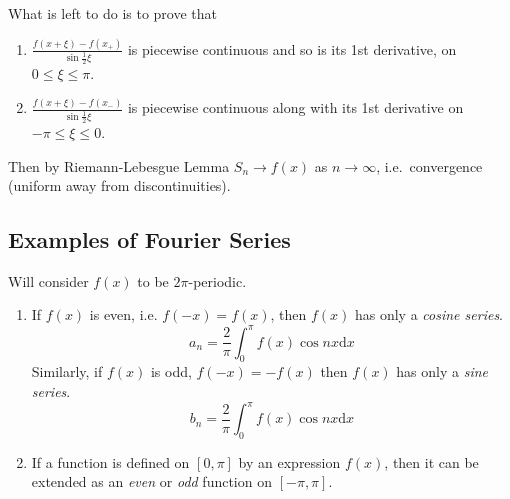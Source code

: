 \documentclass[12pt]{report}
\theoremstyle{definition}
\begin{document}
What is left to do is to prove that 
\begin{enumerate}[label = (\roman*)]
    \item $\frac{f(x + \xi) - f(x_+)}{\sin{\frac{1}{2} \xi}}$ is piecewise continuous and so is its 1st derivative,
        on $0 \le \xi \le \pi$.
    \item $\frac{f(x+\xi) - f(x_-)}{\sin{\frac{1}{2} \xi}}$ is piecewise continuous along with its 1st derivative on
        $-\pi \le \xi \le 0$.
\end{enumerate}
Then by Riemann-Lebesgue Lemma $S_n \rightarrow f(x)$ as $n \rightarrow \infty$, i.e.\ convergence 
(uniform away from discontinuities).

\subsection{Examples of Fourier Series}
Will consider $f(x)$ to be $2\pi$-periodic.
\begin{enumerate}[label = (\roman*)]
    \item If $f(x)$ is even, i.e. $f(-x) = f(x)$, then $f(x)$ has only a \emph{cosine series}.\[
            a_n = \frac{2}{\pi}\int_{0}^{\pi} f(x) \cos{nx} \mathrm{d}x
    \]
    Similarly, if $f(x)$ is odd, $f(-x) = -f(x)$ then $f(x)$ has only a \emph{sine series}. \[
        b_n = \frac{2}{\pi} \int_{0}^{\pi} f(x) \cos{nx} \mathrm{d}x
    \]
\item If a function is defined on $[0,\pi]$ by an expression $f(x)$, then it can be extended as an \emph{even}
    or \emph{odd} function on $[-\pi,\pi]$.
\end{enumerate}
\end{document}
